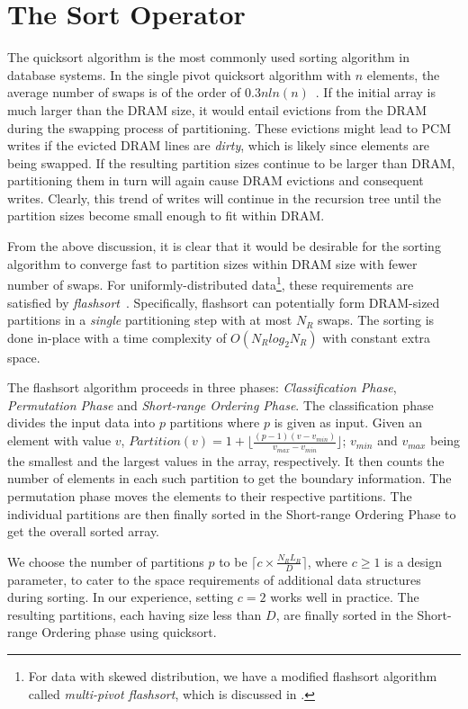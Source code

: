 \section{The Sort Operator}
\label{sort}

The quicksort algorithm is the most commonly used sorting algorithm
in database systems. In the single pivot quicksort algorithm
with $n$ elements, the average number of swaps is of the order of
$0.3nln(n)$~\cite{swaps}. If the initial array is much larger than the
DRAM size, it would entail evictions from the DRAM during the swapping
process of partitioning. These evictions might lead to PCM writes if the
evicted DRAM lines are \textit{dirty}, which is likely since elements are
being swapped. If the resulting partition sizes continue to be larger
than DRAM, partitioning them in turn will again cause DRAM evictions
and consequent writes. Clearly, this trend of writes will continue in
the recursion tree until the partition sizes become small enough to
fit within DRAM. 


From the above discussion, it is clear that it would be desirable
for the sorting algorithm to converge fast to partition sizes within
DRAM size with fewer number of swaps. For uniformly-distributed data\footnote{For data with skewed distribution, we have a modified flashsort algorithm  called \emph{multi-pivot flashsort}, which is discussed in \cite{techreport}.}, these requirements are satisfied by
\emph{flashsort}~\cite{flashsort}. Specifically, flashsort can potentially
form DRAM-sized partitions in a \emph{single} partitioning step with at
most $N_R$ swaps. The sorting is done in-place with a time complexity
of $O(N_Rlog_2N_R)$ with constant extra space.

The flashsort algorithm proceeds in three phases: \emph{Classification
Phase}, \emph{Permutation Phase} and \emph{Short-range Ordering
Phase}. The classification phase divides the input data into $p$
partitions where $p$ is given as input. Given an element with value $v$,
$Partition(v) = 1 + \lfloor \frac{(p-1)(v- v_{min})}{v_{max}-v_{min}}
\rfloor$; $v_{min}$ and $v_{max}$ being the smallest and the largest
values in the array, respectively. It then counts the number of elements
in each such partition to get the boundary information. The permutation
phase moves the elements to their respective partitions. The individual
partitions are then finally sorted in the Short-range Ordering Phase to
get the overall sorted array.

We choose the number of partitions $p$ to be $\lceil c \times \frac{N_R
L_R}{D} \rceil$, where $c \geq 1$ is a design parameter, to cater to the space requirements of additional data structures during sorting. In our experience,
setting $c = 2$ works well in practice. The resulting partitions, each having size less than $D$, are finally sorted in the Short-range Ordering phase using quicksort.



